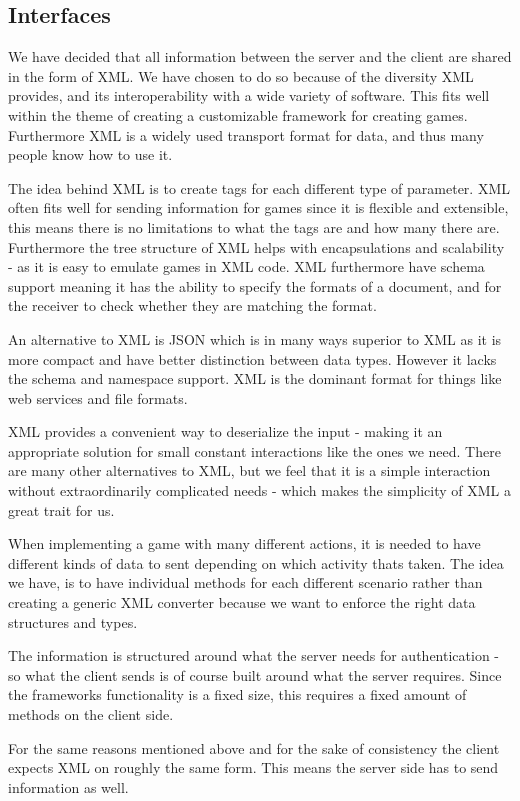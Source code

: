 \subsection{Interfaces}
\label{subsec:interfaces}

We have decided that all information between the server and the client are shared in the form of XML. We have chosen to do so because of the diversity XML provides, and its interoperability with a wide variety of software. This fits well within the theme of creating a customizable framework for creating games. Furthermore XML is a widely used transport format for data, and thus many people know how to use it. 

The idea behind XML is to create tags for each different type of parameter. XML often fits well for sending information for games since it is flexible and extensible, this means there is no limitations to what the tags are and how many there are. Furthermore the tree structure of XML helps with encapsulations and scalability - as it is easy to emulate games in XML code. XML furthermore have schema support meaning it has the ability to specify the formats of a document, and for the receiver to check whether they are matching the format. \cite{xml}

An alternative to XML is JSON which is in many ways superior to XML as it is more compact and have better distinction between data types. However it lacks the schema and namespace support. XML is the dominant format for things like web services and file formats.

XML provides a convenient way to deserialize the input - making it an appropriate solution for small constant interactions like the ones we need. There are many other alternatives to XML, but we feel that it is a simple interaction without extraordinarily complicated needs - which makes the simplicity of XML a great trait for us.

When implementing a game with many different actions, it is needed to have different kinds of data to sent depending on which activity thats taken. The idea we have, is to have individual methods for each different scenario rather than creating a generic XML converter because we want to enforce the right data structures and types. 

The information is structured around what the server needs for authentication - so what the client sends is of course built around what the server requires. Since the frameworks functionality is a fixed size, this requires a fixed amount of methods on the client side.

For the same reasons mentioned above and for the sake of consistency the client expects XML on roughly the same form. This means the server side has to send information as well.
